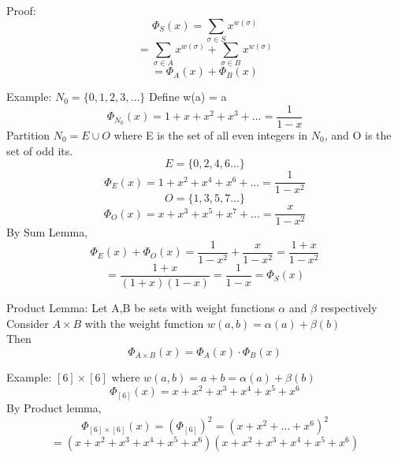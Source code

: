 \documentclass[12pt]{article}
\begin{document}
	Proof: 
	$$\Phi_S(x) = \sum_{\sigma \in S}x^{w(\sigma)}$$
	$$= \sum_{\sigma \in A}x^{w(\sigma)} + \sum_{\sigma \in B}x^{w(\sigma)}$$
	$$= \Phi_A(x) + \Phi_B(x)$$
	
	Example: $N_0 = \{0,1,2,3, ...\}$ Define w(a) = a\\
	$$\Phi_{N_0}(x) = 1 + x + x^2 + x^3 + ... = \frac{1}{1-x}$$
	Partition $N_0 = E \cup O$ where E is the set of all even integers in $N_0$, and O is the set of odd its.\\
	
	$$E = \{0,2,4,6...\}$$
	$$\Phi_E(x) = 1 + x^2 + x^4 + x^6 + ...= \frac{1}{1-x^2}$$
	$$O = \{1,3,5,7 ...\}$$
	$$\Phi_O(x) = x + x^3 + x^5 + x^7 + ... = \frac{x}{1-x^2}$$
	By Sum Lemma, 
	$$\Phi_E(x) + \Phi_O(x) = \frac{1}{1-x^2} + \frac{x}{1-x^2} = \frac{1+x}{1-x^2}$$
	$$= \frac{1+x}{(1+x)(1-x)} = \frac{1}{1-x} = \Phi_S(x)$$
	
	Product Lemma: Let A,B be sets with weight functions $\alpha$ and $\beta$ respectively\\
	Consider $A \times B$ with the weight function $w(a,b) = \alpha(a) + \beta(b)$\\
	Then
	$$\Phi_{A\times B}(x) = \Phi_A(x) \cdot \Phi_B(x)$$
	
	Example: $[6] \times [6]$ where $w(a,b) = a+b = \alpha(a) + \beta(b)$\\
	$$\Phi_{[6]}(x) = x + x^2 + x^3 + x^4 + x^5 + x^6$$
	By Product lemma,
	$$\Phi_{[6] \times [6]}(x) = (\Phi_{[6]})^2 = (x + x^2 + ... + x^6)^2$$
	$$=(x + x^2 + x^3 + x^4 + x^5 + x^6)(x + x^2 + x^3 + x^4 + x^5 + x^6)$$
	
	
	
	
\end{document}
